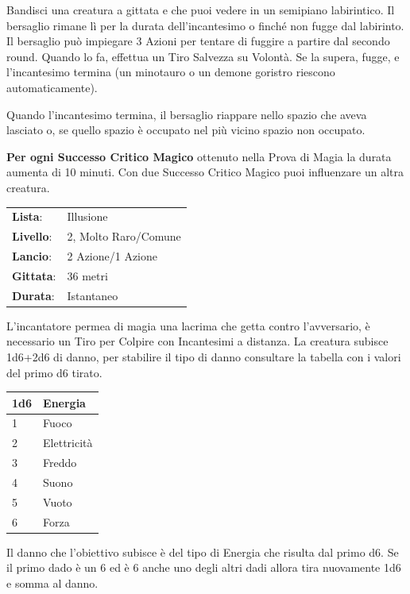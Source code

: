 \begin{multicols}{2}
Bandisci una creatura a gittata e che puoi vedere in un semipiano labirintico. Il bersaglio rimane lì per la durata dell'incantesimo o finché non fugge dal labirinto. Il bersaglio può impiegare 3 Azioni per tentare di fuggire a partire dal secondo round. Quando lo fa, effettua un Tiro Salvezza su Volontà. Se la supera, fugge, e l'incantesimo termina (un minotauro o un demone goristro riescono automaticamente).

Quando l'incantesimo termina, il bersaglio riappare nello spazio che aveva lasciato o, se quello spazio è occupato nel più vicino spazio non occupato.

\textbf{Per ogni Successo Critico Magico} ottenuto nella Prova di Magia la durata aumenta di 10 minuti. Con due Successo Critico Magico puoi influenzare un altra creatura.

\noindent\begin{tabularx}{\linewidth}{p{1.3cm}X}
	\rowcolor{gray!20}\textbf{Lista}: & Illusione \\
	\textbf{Livello}: & 2, Molto Raro/Comune \\
	\rowcolor{gray!20}\textbf{Lancio}: & 2 Azione/1 Azione \\
	\textbf{Gittata}: & 36 metri \\
	\rowcolor{gray!20}\textbf{Durata}: & Istantaneo \\
\end{tabularx}\smallskip

L'incantatore permea di magia una lacrima che getta contro l'avversario, è necessario un Tiro per Colpire con Incantesimi a distanza.
La creatura subisce 1d6+2d6 di danno, per stabilire il tipo di danno consultare la tabella con i valori del primo d6 tirato.

\medskip

\noindent\begin{tabular}{l|l}
	\toprule
 \rowcolor{gray!20}\textbf{1d6}&\textbf{Energia}\\
	\toprule
	1 &Fuoco\\
 \rowcolor{gray!20}2 &Elettricità\\
	3 &Freddo\\
 \rowcolor{gray!20}4 &Suono\\
	5 &Vuoto\\
 \rowcolor{gray!20}6 &Forza
\end{tabular}

\medskip

Il danno che l'obiettivo subisce è del tipo di Energia che risulta dal primo d6. Se il primo dado è un 6 ed è 6 anche uno degli altri dadi allora tira nuovamente 1d6 e somma al danno.


\end{multicols}
